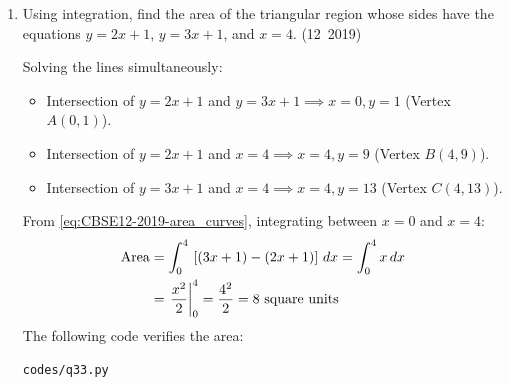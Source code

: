 \begin{enumerate}[label=\thesubsection.\arabic*, ref=\thesubsection.\theenumi]
\solution
From the Riemann sum definition \eqref{eq:CBSE12-2019-riemann_limit}:
\begin{align}
	\int_a^b f(x)\,dx = \lim_{h \to 0} h \sum_{r=1}^n f\brak{a + rh}
\end{align}
where $a = 1, b = 3 \implies nh = b - a = 2$, and $f(x) = x^2 + 2 + e^{2x}$.
Evaluating $f\brak{1 + rh}$:
\begin{align}
	f\brak{1 + rh} = \brak{1 + rh}^2 + 2 + e^{2\brak{1 + rh}} = 3 + 2rh + r^2h^2 + e^2\brak{e^{2h}}^r
\end{align}
Using standard summation formulas \eqref{eq:CBSE12-2019-sum_r}, \eqref{eq:CBSE12-2019-sum_r2}, and \eqref{eq:CBSE12-2019-sum_geom}:
\begin{align}
	h S_n &= 3\brak{nh} + 2h^2\left[\frac{n\brak{n+1}}{2}\right] + h^3\left[\frac{n\brak{n+1}\brak{2n+1}}{6}\right] + e^2 e^{2h} \left(\frac{e^{2nh} - 1}{e^{2h} - 1}\right) h \\
	&= 3\brak{nh} + \brak{nh}\brak{nh + h} + \frac{\brak{nh}\brak{nh + h}\brak{2nh + h}}{6} + e^2\brak{e^{2nh} - 1}e^{2h} \left(\frac{2h}{e^{2h} - 1}\right)\frac{1}{2}
\end{align}
Taking the limit as $h \to 0$ using \eqref{eq:CBSE12-2019-exp_limit}:
\begin{align}
	\int_1^3 \brak{x^2 + 2 + e^{2x}}\,dx &= 3\brak{2} + 2\brak{2} + \frac{2\brak{2}\brak{4}}{6} + \brak{e^6 - e^2}\brak{1}\left(\frac{1}{2}\cdot 1\right) \\
	&= 6 + 4 + \frac{8}{3} + \frac{e^6 - e^2}{2} = \frac{38}{3} + \frac{e^6 - e^2}{2}
\end{align}


\item Using integration, find the area of the triangular region whose sides have the equations $y = 2x + 1$, $y = 3x + 1$, and $x = 4$.
\hfill (12~2019)

\solution
Solving the lines simultaneously:
\begin{itemize}
	\item Intersection of $y = 2x + 1$ and $y = 3x + 1 \implies x = 0, y = 1$ (Vertex $A(0, 1)$).
	\item Intersection of $y = 2x + 1$ and $x = 4 \implies x = 4, y = 9$ (Vertex $B(4, 9)$).
	\item Intersection of $y = 3x + 1$ and $x = 4 \implies x = 4, y = 13$ (Vertex $C(4, 13)$).
\end{itemize}
From \eqref{eq:CBSE12-2019-area_curves}, integrating between $x = 0$ and $x = 4$:
\begin{align}
	\text{Area} &= \int_0^4 {}\left[\left(3x + 1\right) - \left(2x + 1\right)\right]\,dx = \int_0^4 x\,dx \\
	&= \left.\frac{x^2}{2}\right|_0^4 = \frac{4^2}{2} = 8\text{ square units}
\end{align}
The following code verifies the area:
\begin{lstlisting}[frame=single, basicstyle=\ttfamily\small]
	codes/q33.py
\end{lstlisting}


\end{enumerate}
